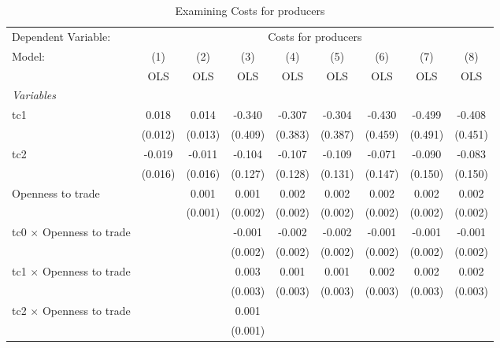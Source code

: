 
\begin{table}[htbp]
   \caption{Examining Costs for producers}
   \centering
   \begin{tabular}{lcccccccc}
      \toprule
      Dependent Variable: & \multicolumn{8}{c}{Costs for producers}\\
      Model:                                  & (1)     & (2)     & (3)     & (4)     & (5)     & (6)     & (7)     & (8)\\  
                                              &  OLS    & OLS     & OLS     & OLS     & OLS     & OLS     & OLS     & OLS\\  
      \midrule
      \emph{Variables}\\
      tc1                                     & 0.018   & 0.014   & -0.340  & -0.307  & -0.304  & -0.430  & -0.499  & -0.408\\   
                                              & (0.012) & (0.013) & (0.409) & (0.383) & (0.387) & (0.459) & (0.491) & (0.451)\\   
      tc2                                     & -0.019  & -0.011  & -0.104  & -0.107  & -0.109  & -0.071  & -0.090  & -0.083\\   
                                              & (0.016) & (0.016) & (0.127) & (0.128) & (0.131) & (0.147) & (0.150) & (0.150)\\   
      Openness to trade                       &         & 0.001   & 0.001   & 0.002   & 0.002   & 0.002   & 0.002   & 0.002\\   
                                              &         & (0.001) & (0.002) & (0.002) & (0.002) & (0.002) & (0.002) & (0.002)\\   
      tc0 $\times$ Openness to trade          &         &         & -0.001  & -0.002  & -0.002  & -0.001  & -0.001  & -0.001\\   
                                              &         &         & (0.002) & (0.002) & (0.002) & (0.002) & (0.002) & (0.002)\\   
      tc1 $\times$ Openness to trade          &         &         & 0.003   & 0.001   & 0.001   & 0.002   & 0.002   & 0.002\\   
                                              &         &         & (0.003) & (0.003) & (0.003) & (0.003) & (0.003) & (0.003)\\   
      tc2 $\times$ Openness to trade          &         &         & 0.001   &         &         &         &         &   \\   
                                              &         &         & (0.001) &         &         &         &         &   \\   

\end{tabular}
\end{table}

